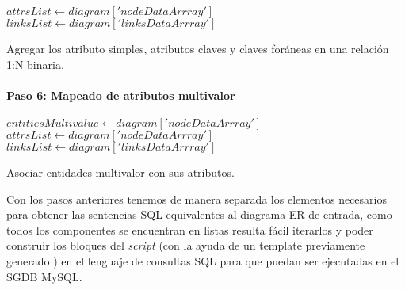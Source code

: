 \begin{algorithm}[H]

    $attrsList \gets diagram['nodeDataArrray']$
    $linksList \gets diagram['linksDataArrray']$
  \caption{Agregar los atributo simples, atributos claves y claves foráneas  en una relación 1:N binaria.}
\end{algorithm}

\paragraph*{Paso 6: Mapeado de atributos multivalor}

\begin{algorithm}[H]

  $entitiesMultivalue \gets diagram['nodeDataArrray']$\\
  $attrsList \gets diagram['nodeDataArrray']$\\
  $linksList \gets diagram['linksDataArrray']$\\
   {
  }
  \caption{Asociar entidades multivalor con sus atributos.}
\end{algorithm}

Con los pasos anteriores tenemos de manera separada los elementos necesarios para obtener las sentencias SQL equivalentes al diagrama ER de entrada, como todos los componentes se encuentran en listas resulta fácil iterarlos y poder construir los bloques del \textit{script} (con la ayuda de un template previamente generado ) en el lenguaje de consultas SQL para que puedan ser ejecutadas en el SGDB MySQL.

